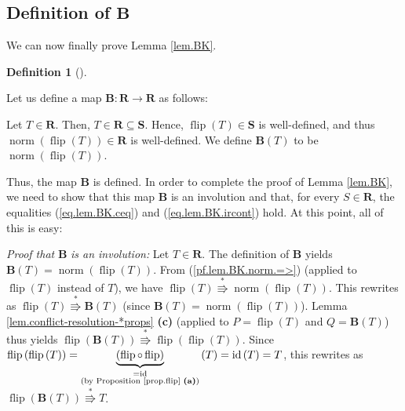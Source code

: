 \documentclass[numbers=enddot,12pt,final,onecolumn,notitlepage]{scrartcl}%
\theoremstyle{definition}
\newtheorem{defi}[theo]{Definition}
\newenvironment{definition}[1][]
{\begin{defi}[#1]\begin{leftbar}}
{\end{leftbar}\end{defi}}
\begin{document}
\subsection{Definition of $\mathbf{B}$}

We can now finally prove Lemma \ref{lem.BK}.

\begin{definition}
Let us define a map $\mathbf{B}:\mathbf{R}\rightarrow\mathbf{R}$ as follows:

Let $T\in\mathbf{R}$. Then, $T\in\mathbf{R}\subseteq\mathbf{S}$. Hence,
$\operatorname*{flip}\left(  T\right)  \in\mathbf{S}$ is well-defined, and
thus $\operatorname*{norm}\left(  \operatorname*{flip}\left(  T\right)
\right)  \in\mathbf{R}$ is well-defined. We define $\mathbf{B}\left(
T\right)  $ to be $\operatorname*{norm}\left(  \operatorname*{flip}\left(
T\right)  \right)  $.
\end{definition}

Thus, the map $\mathbf{B}$ is defined. In order to complete the proof of Lemma
\ref{lem.BK}, we need to show that this map $\mathbf{B}$ is an involution and
that, for every $S\in\mathbf{R}$, the equalities (\ref{eq.lem.BK.ceq}) and
(\ref{eq.lem.BK.ircont}) hold. At this point, all of this is easy:

\textit{Proof that }$\mathbf{B}$ \textit{is an involution:} Let $T\in
\mathbf{R}$. The definition of $\mathbf{B}$ yields $\mathbf{B}\left(
T\right)  =\operatorname*{norm}\left(  \operatorname*{flip}\left(  T\right)
\right)  $. From (\ref{pf.lem.BK.norm.=>}) (applied to $\operatorname*{flip}%
\left(  T\right)  $ instead of $T$), we have $\operatorname*{flip}\left(
T\right)  \overset{\ast}{\Rrightarrow}\operatorname*{norm}\left(
\operatorname*{flip}\left(  T\right)  \right)  $. This rewrites as
$\operatorname*{flip}\left(  T\right)  \overset{\ast}{\Rrightarrow}%
\mathbf{B}\left(  T\right)  $ (since $\mathbf{B}\left(  T\right)
=\operatorname*{norm}\left(  \operatorname*{flip}\left(  T\right)  \right)
$). Lemma \ref{lem.conflict-resolution-*props} \textbf{(c)} (applied to
$P=\operatorname*{flip}\left(  T\right)  $ and $Q=\mathbf{B}\left(  T\right)
$) thus yields $\operatorname*{flip}\left(  \mathbf{B}\left(  T\right)
\right)  \overset{\ast}{\Rrightarrow}\operatorname*{flip}\left(
\operatorname*{flip}\left(T\right)\right)  $. Since $\operatorname*{flip}\left(
\operatorname*{flip}\left(T\right)\right)  =\underbrace{\left(  \operatorname*{flip}%
\circ\operatorname*{flip}\right)  }_{\substack{=\operatorname*{id}\\\text{(by
Proposition \ref{prop.flip} \textbf{(a)})}}}\left(  T\right)
=\operatorname*{id}\left(  T\right)  =T$, this rewrites as
$\operatorname*{flip}\left(  \mathbf{B}\left(  T\right)  \right)
\overset{\ast}{\Rrightarrow}T$.
\end{document}
